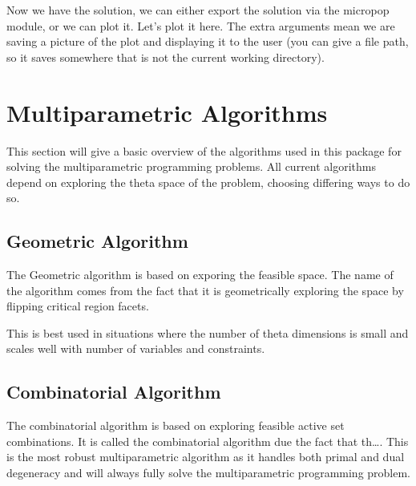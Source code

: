 \documentclass[letterpaper,10pt,english]{sphinxmanual}
\begin{document}
\begin{sphinxVerbatim}[commandchars=\\\{\}]
  
\end{sphinxVerbatim}

\sphinxAtStartPar
Now we have the solution, we can either export the solution via the micropop module, or we can plot it. Let’s plot it here. The extra arguments mean we are saving a picture of the plot and displaying it to the user (you can give a file path, so it saves somewhere that is not the current working directory).

\begin{sphinxVerbatim}[commandchars=\\\{\}]
     
\end{sphinxVerbatim}


\section{Multiparametric Algorithms}
\label{\detokenize{algorithm_overview:multiparametric-algorithms}}\label{\detokenize{algorithm_overview::doc}}
\sphinxAtStartPar
This section will give a basic overview of the algorithms used in this package for solving the multiparametric programming problems. All current algorithms depend on exploring the theta space of the problem, choosing differing ways to do so.


\subsection{Geometric Algorithm}
\label{\detokenize{algorithm_overview:geometric-algorithm}}
\sphinxAtStartPar
The Geometric algorithm is based on exporing the feasible space. The name of the algorithm comes from the fact that it is geometrically exploring the space by flipping critical region facets.

\sphinxAtStartPar
This is best used in situations where the number of theta dimensions is small and scales well with number of variables and constraints.


\subsection{Combinatorial Algorithm}
\label{\detokenize{algorithm_overview:combinatorial-algorithm}}
\sphinxAtStartPar
The combinatorial algorithm is based on exploring feasible active set combinations. It is called the combinatorial algorithm due the fact that th…. This is the most robust multiparametric algorithm as it handles both primal and dual degeneracy and will always fully solve the multiparametric programming problem.
\end{document}
